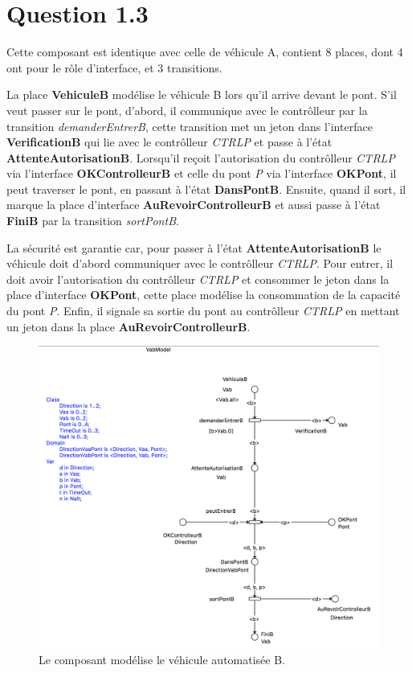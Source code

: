 \documentclass[a4paper,11pt]{report}
\begin{document}
\section{Question 1.3}
	Cette composant est identique avec celle de véhicule A, contient 8 places, dont 4 ont pour le rôle d'interface, et 3 transitions.
	
	La place \textbf{VehiculeB} modélise le véhicule B  lors qu'il arrive devant le pont. S'il veut passer sur le pont, d'abord, il communique avec le contrôlleur par la transition \textit{demanderEntrerB}, cette transition met un jeton dans l'interface \textbf{VerificationB} qui lie avec le contrôlleur \textit{CTRLP} et passe à l'état \textbf{AttenteAutorisationB}. Lorsqu'il reçoit l'autorisation du contrôlleur \textit{CTRLP} via l'interface \textbf{OKControlleurB} et celle du pont \textit{P} via l'interface \textbf{OKPont}, il peut traverser le pont, en passant à l'état \textbf{DansPontB}. Ensuite, quand il sort, il marque la place d'interface \textbf{AuRevoirControlleurB} et aussi passe à l'état \textbf{FiniB} par la transition \textit{sortPontB}.
	
	La sécurité est garantie car, pour passer à l'état \textbf{AttenteAutorisationB} le véhicule doit d'abord communiquer avec le contrôlleur \textit{CTRLP}. Pour entrer, il doit avoir l'autorisation du contrôlleur \textit{CTRLP} et consommer le jeton dans la place d'interface \textbf{OKPont},  cette place modélise la consommation de la capacité du pont \textit{P}. Enfin, il signale sa sortie du pont au contrôlleur \textit{CTRLP} en mettant un jeton dans la place \textbf{AuRevoirControlleurB}.

		\begin{figure}[!htbp]
		\centering
		\includegraphics[width = 15cm]{vabModel.png}
		\caption{Le composant modélise le véhicule automatisée B.}
	\end{figure}
	\newpage
	
\end{document}
